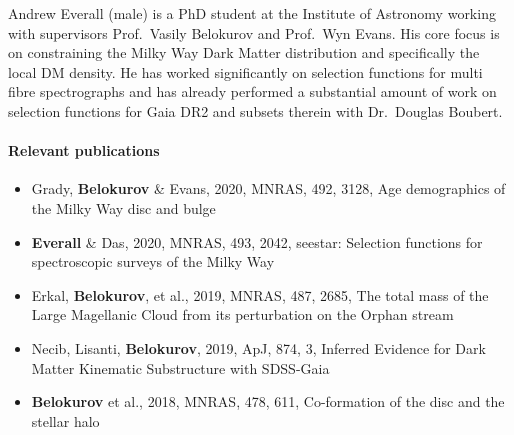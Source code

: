 Andrew Everall (male) is a PhD student at the Institute of Astronomy working with supervisors Prof.~Vasily Belokurov and Prof.~Wyn Evans. His core focus is on constraining the Milky Way Dark Matter distribution and specifically the local DM density. He has worked significantly on selection functions for multi fibre spectrographs and has already performed a substantial amount of work on selection functions for Gaia DR2 and subsets therein with Dr.~Douglas Boubert. 

\paragraph{Relevant publications}

\begin{itemize}
    \item Grady, \textbf{Belokurov} \& Evans, 2020, MNRAS, 492, 3128, Age demographics of the Milky Way disc and bulge
    \item \textbf{Everall} \& Das, 2020, MNRAS, 493, 2042, seestar: Selection functions for spectroscopic surveys of the Milky Way
    \item Erkal, \textbf{Belokurov}, et al., 2019, MNRAS, 487, 2685, The total mass of the Large Magellanic Cloud from its perturbation on the Orphan stream
    \item Necib, Lisanti, \textbf{Belokurov}, 2019, ApJ, 874, 3, Inferred Evidence for Dark Matter Kinematic Substructure with SDSS-Gaia
    \item \textbf{Belokurov} et al., 2018, MNRAS, 478, 611, Co-formation of the disc and the stellar halo
\end{itemize}

